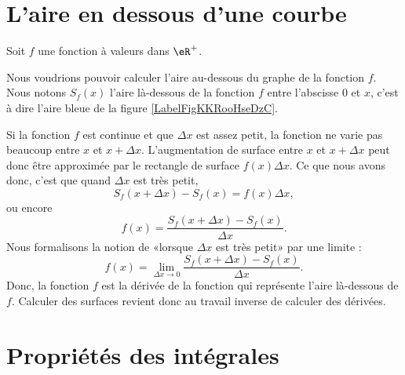 
\section{L'aire en dessous d'une courbe}

Soit $f$ une fonction à valeurs dans $\eR^+$.

Nous voudrions pouvoir calculer l'aire au-dessous du graphe de la fonction \( f\). Nous notons $S_f(x)$ l'aire là-dessous de la fonction $f$ entre l'abscisse $0$ et $x$, c'est à dire l'aire bleue de la figure \ref{LabelFigKKRooHseDzC}. 

\newcommand{\CaptionFigKKRooHseDzC}{L'aire en dessous d'une courbe. Le rectangle rouge d'aire $f(x)\Delta x$ approxime de combien la surface augmente lorsqu'on passe de $x$ à $x+\Delta x$.}


Si la fonction $f$ est continue et que $\Delta x$ est assez petit, la fonction ne varie pas beaucoup entre $x$ et $x+\Delta x$. L'augmentation de surface entre $x$ et $x+\Delta x$ peut donc être approximée par le rectangle de surface $f(x)\Delta x$. Ce que nous avons donc, c'est que quand $\Delta x$ est très petit,
\begin{equation}
	S_f(x+\Delta x)-S_f(x)=f(x)\Delta x,
\end{equation}
ou encore
\begin{equation}
	f(x)=\frac{  S_f(x+\Delta x)-S_f(x)}{ \Delta x }.
\end{equation}
Nous formalisons la notion de «lorsque \( \Delta x\) est très petit» par une limite :
\begin{equation}
	f(x)=\lim_{\Delta x\to 0}\frac{  S_f(x+\Delta x)-S_f(x)}{ \Delta x }.
\end{equation}
Donc, la fonction $f$ est la dérivée de la fonction qui représente l'aire là-dessous de $f$. Calculer des surfaces revient donc au travail inverse de calculer des dérivées.

\section{Propriétés des intégrales}

